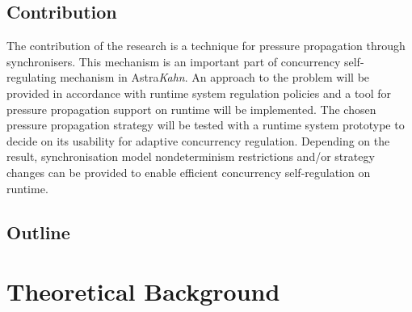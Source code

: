 


    \section{Contribution}
The contribution of the research is a technique for pressure propagation through synchronisers. This mechanism is an important part of concurrency self-regulating mechanism in Astra\emph{Kahn}. An approach to the problem will be provided in accordance with runtime system regulation policies and a tool for pressure propagation support on runtime will be implemented. The chosen pressure propagation strategy will be tested with a runtime system prototype to decide on its usability for adaptive concurrency regulation. Depending on the result, synchronisation model nondeterminism restrictions and/or strategy changes can be provided to enable efficient concurrency self-regulation on runtime.


    \section{Outline}



\chapter{Theoretical Background}

